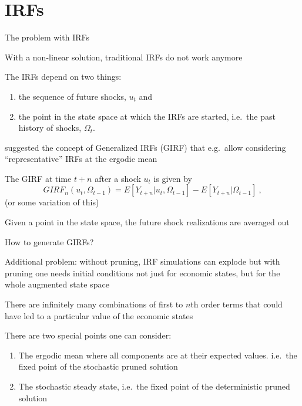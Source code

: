 \section{IRFs}
\begin{frame}{The problem with IRFs}
\begin{witemize}
\item With a non-linear solution, traditional IRFs do not work anymore
\item The IRFs depend on two things:
\begin{enumerate}
  \item the sequence of future shocks, $u_t$ and
  \item the point in the state space at which the IRFs are started, i.e.\ the past history of shocks, $\Omega _t$.
\end{enumerate}
\item \textcite{KoopPesaranPotter1996} suggested the concept of Generalized IRFs (GIRF) that e.g.\ allow considering ``representative'' IRFs at the ergodic mean
\item The GIRF at time $t+n$ after a shock $u_t$ is given by
 \begin{equation}
 GIRF_n\left( {{u_t},{\Omega _{t - 1}}} \right) = E\left[ {{Y_{t + n}}|{u _t},{\Omega _{t - 1}}} \right] - E\left[ {{Y_{t + n}}|{\Omega _{t - 1}}} \right] \: , \label{eq:girf}
 \end{equation}
 (or some variation of this)
\item Given a point in the state space, the future shock realizations are averaged out
\end{witemize}
\end{frame}

\begin{frame}{How to generate GIRFs?}
\begin{witemize}
\item Additional problem: without pruning, IRF simulations can explode but with pruning one needs initial conditions not just for economic states, but for the whole augmented state space
\item There are infinitely many combinations of first to $n$th order terms that could have led to a particular value of the economic states
\item There are two special points one can consider:
\begin{enumerate}
  \item The ergodic mean where all components are at their expected values. i.e.\ the fixed point of the stochastic pruned solution
  \item The stochastic steady state, i.e.\ the fixed point of the deterministic pruned solution
\end{enumerate}

\end{witemize}
\end{frame}

